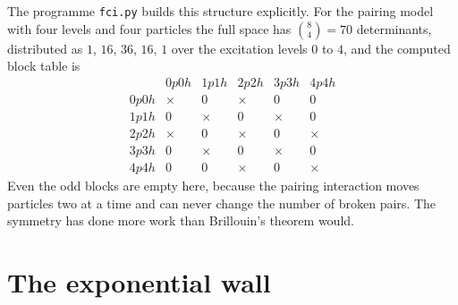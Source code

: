 The programme \texttt{fci.py} builds this structure explicitly.  For the
pairing model with four levels and four particles the full space has
$\binom{8}{4}=70$ determinants, distributed as $1$, $16$, $36$, $16$, $1$ over
the excitation levels $0$ to $4$, and the computed block table is
\begin{equation}
  \begin{array}{c|ccccc}
     & 0p0h & 1p1h & 2p2h & 3p3h & 4p4h\\
    \hline
    0p0h & \times & 0 & \times & 0 & 0\\
    1p1h & 0 & \times & 0 & \times & 0\\
    2p2h & \times & 0 & \times & 0 & \times\\
    3p3h & 0 & \times & 0 & \times & 0\\
    4p4h & 0 & 0 & \times & 0 & \times
  \end{array}
  \label{eq:5-pairingblocks}
\end{equation}
Even the odd blocks are empty here, because the pairing interaction moves
particles two at a time and can never change the number of broken pairs.  The
symmetry has done more work than Brillouin's theorem would.

\section{The exponential wall}
\label{sec:exponentialwall}

